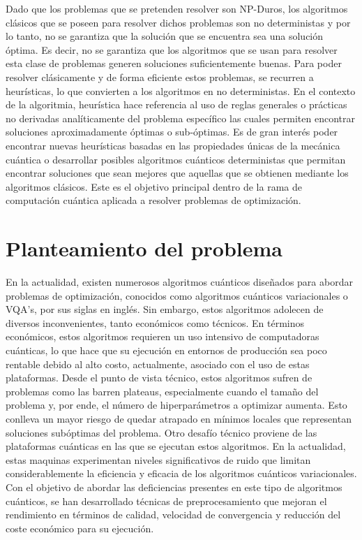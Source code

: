 \newpage

Dado que los problemas que se pretenden resolver son NP-Duros, los algoritmos clásicos que se poseen para resolver dichos problemas son no deterministas y por lo tanto, no se garantiza que la solución que se encuentra sea una solución óptima. Es decir, no se garantiza que los algoritmos que se usan para resolver esta clase de problemas generen soluciones suficientemente buenas. Para poder resolver clásicamente y de forma eficiente estos problemas, se recurren a heurísticas, lo que convierten a los algoritmos en no deterministas. En el contexto de la algoritmia, heurística hace referencia al uso de reglas generales o prácticas no derivadas analíticamente del problema específico las cuales permiten encontrar soluciones aproximadamente óptimas o sub-óptimas. Es de gran interés poder encontrar nuevas heurísticas basadas en las propiedades únicas de la mecánica cuántica o desarrollar posibles algoritmos cuánticos deterministas que permitan encontrar soluciones que sean mejores que aquellas que se obtienen mediante los algoritmos clásicos. Este es el objetivo principal dentro de la rama de computación cuántica aplicada a resolver problemas de optimización. 

\section{Planteamiento del problema}

En la actualidad, existen numerosos algoritmos cuánticos diseñados para abordar problemas de optimización, conocidos como algoritmos cuánticos variacionales o VQA's, por sus siglas en inglés. Sin embargo, estos algoritmos adolecen de diversos inconvenientes, tanto económicos como técnicos. En términos económicos, estos algoritmos requieren un uso intensivo de computadoras cuánticas, lo que hace que su ejecución en entornos de producción sea poco rentable debido al alto costo, actualmente, asociado con el uso de estas plataformas. Desde el punto de vista técnico, estos algoritmos sufren de problemas como las barren plateaus, especialmente cuando el tamaño del problema y, por ende, el número de hiperparámetros a optimizar aumenta. Esto conlleva un mayor riesgo de quedar atrapado en mínimos locales que representan soluciones subóptimas del problema. Otro desafío técnico proviene de las plataformas cuánticas en las que se ejecutan estos algoritmos. En la actualidad, estas maquinas experimentan niveles significativos de ruido que limitan considerablemente la eficiencia y eficacia de los algoritmos cuánticos variacionales. Con el objetivo de abordar las deficiencias presentes en este tipo de algoritmos cuánticos, se han desarrollado técnicas de preprocesamiento que mejoran el rendimiento en términos de calidad, velocidad de convergencia y reducción del coste económico para su ejecución. 

